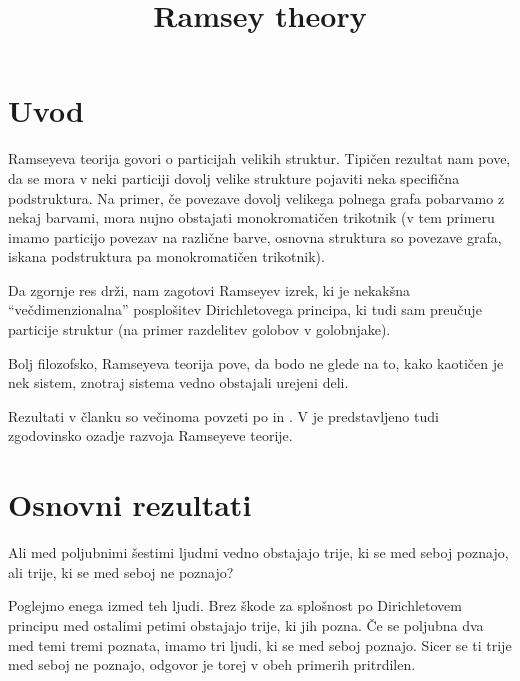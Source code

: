 \documentclass[twoside,11pt]{article}
\begin{document}



\title{Ramsey theory}

\glava\baselineskip=14.5pt

\smallskip

\section{Uvod}

\hspace{\parindent}Ramseyeva teorija govori o particijah velikih struktur. Tipičen rezultat nam pove, da 
se mora v neki particiji dovolj velike strukture pojaviti neka specifična podstruktura. Na primer, 
če povezave dovolj velikega polnega grafa pobarvamo z nekaj barvami, mora nujno obstajati 
monokromatičen trikotnik (v tem primeru imamo particijo povezav na različne barve, 
osnovna struktura so povezave grafa, iskana podstruktura pa monokromatičen trikotnik).

Da zgornje res drži, nam zagotovi Ramseyev izrek, ki je nekakšna "`večdimenzionalna"' posplošitev 
Dirichletovega principa, ki tudi sam preučuje particije struktur (na primer razdelitev golobov v
golobnjake).

Bolj filozofsko, Ramseyeva teorija pove, da bodo ne glede na to, kako kaotičen je nek sistem, 
znotraj sistema vedno obstajali urejeni deli.

Rezultati v članku so večinoma povzeti po \cite{color} in \cite{west}. V \cite{color} je 
predstavljeno tudi zgodovinsko ozadje razvoja Ramseyeve teorije.

\section{Osnovni rezultati}
\begin{zgled}
    Ali med poljubnimi šestimi ljudmi vedno obstajajo trije, ki se med seboj
    poznajo, ali trije, ki se med seboj ne poznajo?

    Poglejmo enega izmed teh ljudi. Brez škode za splošnost po Dirichletovem principu med 
    ostalimi petimi obstajajo trije, ki jih pozna. Če se poljubna dva med temi tremi poznata, 
    imamo tri ljudi, ki se med seboj poznajo. Sicer se ti trije med seboj ne poznajo, odgovor je 
    torej v obeh primerih pritrdilen.
\end{zgled}
\end{document}
